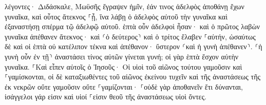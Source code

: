 \documentclass{openreader}
\begin{document}
λέγοντες· Διδάσκαλε, Μωϋσῆς ἔγραψεν ἡμῖν, ἐάν τινος ἀδελφὸς ἀποθάνῃ ἔχων γυναῖκα, καὶ οὗτος ἄτεκνος ⸀ᾖ, ἵνα λάβῃ ὁ ἀδελφὸς αὐτοῦ τὴν γυναῖκα καὶ ἐξαναστήσῃ σπέρμα τῷ ἀδελφῷ αὐτοῦ. 
ἑπτὰ οὖν ἀδελφοὶ ἦσαν· καὶ ὁ πρῶτος λαβὼν γυναῖκα ἀπέθανεν ἄτεκνος· 
καὶ ⸂ὁ δεύτερος⸃ 
καὶ ὁ τρίτος ἔλαβεν ⸀αὐτήν, ὡσαύτως δὲ καὶ οἱ ἑπτὰ οὐ κατέλιπον τέκνα καὶ ἀπέθανον· 
ὕστερον ⸂καὶ ἡ γυνὴ ἀπέθανεν⸃. 
⸂ἡ γυνὴ οὖν ἐν τῇ⸃ ἀναστάσει τίνος αὐτῶν γίνεται γυνή; οἱ γὰρ ἑπτὰ ἔσχον αὐτὴν γυναῖκα. 
⸀Καὶ εἶπεν αὐτοῖς ὁ Ἰησοῦς· Οἱ υἱοὶ τοῦ αἰῶνος τούτου γαμοῦσιν καὶ ⸀γαμίσκονται, 
οἱ δὲ καταξιωθέντες τοῦ αἰῶνος ἐκείνου τυχεῖν καὶ τῆς ἀναστάσεως τῆς ἐκ νεκρῶν οὔτε γαμοῦσιν οὔτε ⸀γαμίζονται· 
⸀οὐδὲ γὰρ ἀποθανεῖν ἔτι δύνανται, ἰσάγγελοι γάρ εἰσιν καὶ υἱοί ⸀εἰσιν θεοῦ τῆς ἀναστάσεως υἱοὶ ὄντες. 
\end{document}
